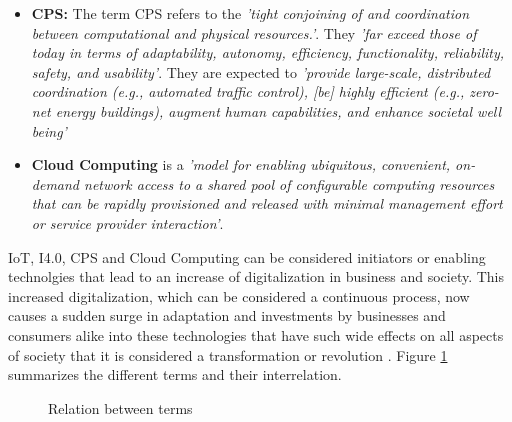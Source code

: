 \begin{itemize}
  \item \textbf{\acl{CPS}:} The term \ac{CPS} refers to the \emph{'tight conjoining of and coordination between computational and physical resources.'}. They \emph{'far exceed those of today in terms of adaptability, autonomy, efficiency, functionality, reliability, safety, and usability'}. They are expected to \emph{'provide large-scale, distributed coordination (e.g., automated traffic control), [be] highly efficient (e.g., zero-net energy buildings), augment human capabilities, and enhance societal well being'}  \cite{cps:nsf:2011}
  
  \item \textbf{Cloud Computing} is a \emph{'model for enabling ubiquitous, convenient, on-demand network access to a shared pool of configurable computing resources that can be rapidly provisioned and released with minimal management effort or service provider interaction'}\cite{Mell:2011:SND:2206223}.
\end{itemize}

\ac{IoT}, \ac{I4.0}, \ac{CPS} and Cloud Computing can be considered initiators or enabling technolgies that lead to an increase of digitalization in business and society. This increased digitalization, which can be considered a continuous process, now causes a sudden surge in adaptation and investments by businesses and consumers alike into these technologies that have such wide effects on all aspects of society that it is considered a transformation or revolution \cite{Kagermann:2013}. 
Figure \ref{fig:terms} summarizes the different terms and their interrelation.

\begin{figure}[H]
\centering
{}
\caption{Relation between terms} \label{fig:terms}
\end{figure}


